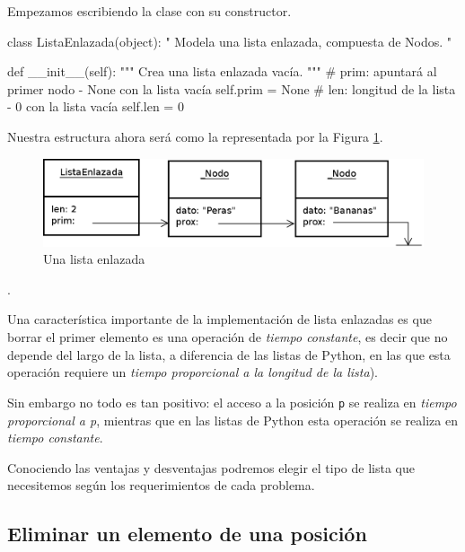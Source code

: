 Empezamos escribiendo la clase con su constructor.

\begin{codigo-python-sn}
class ListaEnlazada(object):
    " Modela una lista enlazada, compuesta de Nodos. "

    def __init__(self):
        """ Crea una lista enlazada vacía. """
        # prim: apuntará al primer nodo - None con la lista vacía
        self.prim = None
        # len: longitud de la lista - 0 con la lista vacía 
        self.len = 0
\end{codigo-python-sn}

Nuestra estructura ahora será como la representada por la Figura
\ref{lista_enlazada}.

\begin{figure}[htb]
\label{lista_enlazada}
\includegraphics{graficos/16_ListaEnlazada}
\caption{Una lista enlazada}
\end{figure}

.

\begin{sabias_que}
Una característica importante de la implementación de lista enlazadas es que
borrar el primer elemento es una operación de {\it tiempo constante}, es
decir que no depende del largo de la lista, a diferencia de las listas de
Python, en las que esta operación requiere un {\it tiempo proporcional a la
longitud de la lista}). 

Sin embargo no todo es tan positivo: el acceso a la posición {\tt p} se realiza
en {\it tiempo proporcional a p}, mientras que en las listas de Python esta
operación se realiza en {\it tiempo constante}.

Conociendo las ventajas y desventajas podremos elegir el tipo de lista que
necesitemos según los requerimientos de cada problema.
\end{sabias_que}

\subsection{Eliminar un elemento de una posición}

